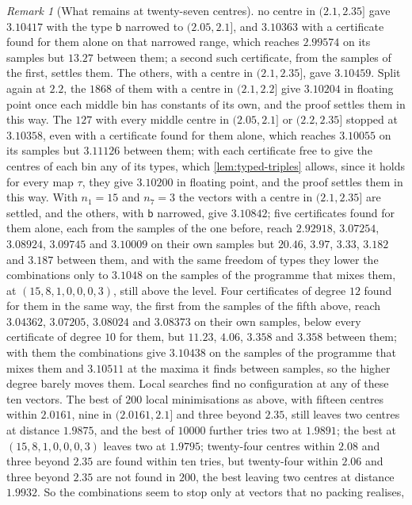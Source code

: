 \documentclass[11pt,reqno]{amsart}
\renewcommand{\_}{\origunderscore\allowbreak}
\numberwithin{equation}{section}
\theoremstyle{plain}
\theoremstyle{definition}
\theoremstyle{remark}
\newtheorem{remark}[thm]{Remark}
\begin{document}
\begin{remark}[What remains at twenty-seven centres]
no centre in $(2.1,2.35]$ gave $3.10417$ with the type $\mathsf b$ narrowed
to $(2.05,2.1]$, and $3.10363$ with a certificate found for them alone on
that narrowed range, which reaches $2.99574$ on its samples but $13.27$
between them; a second such certificate, from the samples of the first,
settles them. The others, with a centre in $(2.1,2.35]$, gave $3.10459$.
Split again at $2.2$, the $1868$ of them with a centre in $(2.1,2.2]$ give
$3.10204$ in floating point once each middle bin has constants of its own,
and the proof settles them in this way. The $127$ with every middle centre in $(2.05,2.1]$ or $(2.2,2.35]$
stopped at $3.10358$, even with a certificate found for them alone, which
reaches $3.10055$ on its samples but $3.11126$ between them; with each
certificate free to give the centres of each bin any of its types, which
\cref{lem:typed-triples} allows, since it holds for every map $\tau$, they
give $3.10200$ in floating point, and the proof settles them in this way.
With $n_1=15$ and $n_7=3$ the vectors with a centre in
$(2.1,2.35]$ are settled, and the others, with $\mathsf b$ narrowed, give
$3.10842$; five certificates found for them alone, each from the samples
of the one before, reach $2.92918$, $3.07254$, $3.08924$, $3.09745$ and
$3.10009$ on their own samples but $20.46$, $3.97$, $3.33$, $3.182$ and
$3.187$ between them, and with the same freedom of types they lower the
combinations only to $3.1048$ on the samples of the programme that mixes
them, at $(15,8,1,0,0,0,3)$, still above the level. Four certificates
of degree $12$ found for them in the same way, the first from the samples
of the fifth above, reach $3.04362$, $3.07205$, $3.08024$ and $3.08373$ on
their own samples, below every certificate of degree $10$ for them, but
$11.23$, $4.06$, $3.358$ and $3.358$ between them; with them the
combinations give $3.10438$ on the samples of the programme that mixes
them and $3.10511$ at the maxima it finds between samples, so the higher
degree barely moves them. Local searches
find no configuration at any of these ten vectors. The best of $200$
local minimisations as above, with fifteen centres within $2.0161$, nine
in $(2.0161,2.1]$ and three beyond $2.35$, still leaves two centres at
distance $1.9875$, and the best of $10000$ further tries two at $1.9891$; the best at $(15,8,1,0,0,0,3)$ leaves two at $1.9795$;
twenty-four centres within $2.08$ and three beyond $2.35$ are found
within ten tries, but twenty-four within $2.06$ and three beyond $2.35$ are
not found in $200$, the best leaving two centres at distance $1.9932$. So
the combinations seem to stop only at vectors that no packing realises,

\end{remark}
\end{document}
